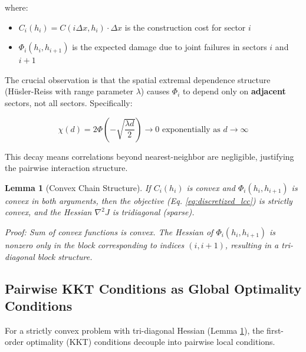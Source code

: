 \documentclass[review]{elsarticle}
\newtheorem{lemma}[theorem]{Lemma}
\begin{document}
where:
\begin{itemize}
\item $C_i(h_i) = C(i\Delta x, h_i) \cdot \Delta x$ is the construction cost for sector $i$
\item $\Phi_i(h_i, h_{i+1})$ is the expected damage due to joint failures in sectors $i$ and $i+1$
\end{itemize}

The crucial observation is that the spatial extremal dependence structure (Hüsler-Reiss with range parameter $\lambda$) causes $\Phi_i$ to depend only on \textbf{adjacent} sectors, not all sectors. Specifically:

\begin{equation}
\chi(d) = 2\Phi\left(-\sqrt{\frac{\lambda d}{2}}\right) \to 0 \text{ exponentially as } d \to \infty
\label{eq:extremal_decay}
\end{equation}

This decay means correlations beyond nearest-neighbor are negligible, justifying the pairwise interaction structure.

\begin{lemma}[Convex Chain Structure]
\label{lem:convex_chain}
If $C_i(h_i)$ is convex and $\Phi_i(h_i, h_{i+1})$ is convex in both arguments, then the objective (Eq. \eqref{eq:discretized_lcc}) is strictly convex, and the Hessian $\nabla^2 J$ is tridiagonal (sparse).

\textit{Proof:} Sum of convex functions is convex. The Hessian of $\Phi_i(h_i, h_{i+1})$ is nonzero only in the block corresponding to indices $(i, i+1)$, resulting in a tri-diagonal block structure.
\end{lemma}

\subsection{Pairwise KKT Conditions as Global Optimality Conditions}

For a strictly convex problem with tri-diagonal Hessian (Lemma \ref{lem:convex_chain}), the first-order optimality (KKT) conditions decouple into pairwise local conditions.
\end{document}
